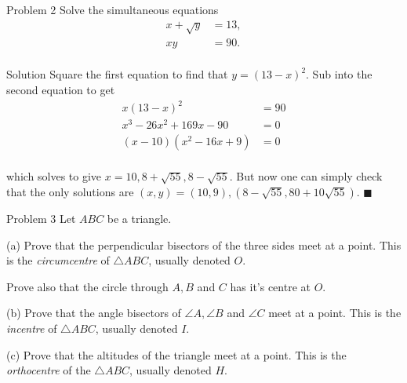 \documentclass{article}
\begin{document}
\begin{problem}{Problem 2}
Solve the simultaneous equations
\[
\begin{aligned}
x + \sqrt{y} &= 13,\\
xy &= 90.\\
\end{aligned}
\]
\end{problem}

\begin{solution}{Solution}
Square the first equation to find that $y = (13 - x)^2$. Sub into the
second equation to get
\[
\begin{aligned}
x(13 - x)^2 &= 90 \\
x^3 - 26x^2 + 169x - 90 &= 0 \\
(x - 10)(x^2 - 16x + 9) &= 0 \\
\end{aligned}
\]

which solves to give $x = 10, 8 + \sqrt{55}, 8 - \sqrt{55}$. But now one can
simply check that the only solutions are
$(x, y) = (10, 9), (8 - \sqrt{55}, 80 + 10\sqrt{55})$. $\blacksquare$
\end{solution}
\newpage

\begin{problem}{Problem 3}
Let $ABC$ be a triangle.
\vspace{0.2cm}

(a) Prove that the perpendicular bisectors of the three sides meet at a
point. This is the \textit{circumcentre} of $\triangle ABC$, usually
denoted $O$. \vspace{0.2cm}

Prove also that the circle through $A, B$ and $C$ has it's centre at $O$.
\vspace{0.2cm}

(b) Prove that the angle bisectors of $\angle A, \angle B$ and $\angle C$
meet at a point. This is the \textit{incentre} of $\triangle ABC$, usually
denoted $I$. \vspace{0.2cm}

(c) Prove that the altitudes of the triangle meet at a point. This is the
\textit{orthocentre} of the $\triangle ABC$, usually denoted $H$.
\end{problem}
\end{document}
